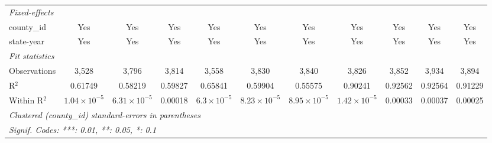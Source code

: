 \begin{tabular}{lcccccccccc}
   \midrule
   \emph{Fixed-effects}\\
   county\_id                                & Yes                   & Yes                   & Yes     & Yes                  & Yes                   & Yes                   & Yes                   & Yes      & Yes      & Yes\\  
   state-year                                & Yes                   & Yes                   & Yes     & Yes                  & Yes                   & Yes                   & Yes                   & Yes      & Yes      & Yes\\  
   \midrule
   \emph{Fit statistics}\\
   Observations                              & 3,528                 & 3,796                 & 3,814   & 3,558                & 3,830                 & 3,840                 & 3,826                 & 3,852    & 3,934    & 3,894\\  
   R$^2$                                     & 0.61749               & 0.58219               & 0.59827 & 0.65841              & 0.59904               & 0.55575               & 0.90241               & 0.92562  & 0.92564  & 0.91229\\  
   Within R$^2$                              & $1.04\times 10^{-5}$  & $6.31\times 10^{-5}$  & 0.00018 & $6.3\times 10^{-5}$  & $8.23\times 10^{-5}$  & $8.95\times 10^{-5}$  & $1.42\times 10^{-5}$  & 0.00033  & 0.00037  & 0.00025\\  
   \midrule \midrule
   \multicolumn{11}{l}{\emph{Clustered (county\_id) standard-errors in parentheses}}\\
   \multicolumn{11}{l}{\emph{Signif. Codes: ***: 0.01, **: 0.05, *: 0.1}}\\
\end{tabular}
\par\endgroup


